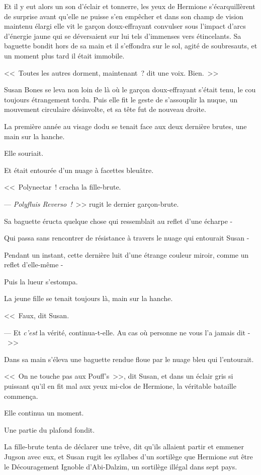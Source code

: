 Et il y eut alors un son d'éclair et tonnerre, les yeux de Hermione s'écarquillèrent de surprise avant qu'elle ne puisse s'en empêcher et dans son champ de vision maintenu élargi elle vit le garçon doux-effrayant convulser sous l'impact d'arcs d'énergie jaune qui se déversaient sur lui tels d'immenses vers étincelants. Sa baguette bondit hors de sa main et il s'effondra sur le sol, agité de soubresauts, et un moment plus tard il était immobile.

<<~Toutes les autres dorment, maintenant~? dit une voix. Bien.~>>

Susan Bones se leva non loin de là où le garçon doux-effrayant s'était tenu, le cou toujours étrangement tordu. Puis elle fit le geste de s'assouplir la nuque, un mouvement circulaire désinvolte, et sa tête fut de nouveau droite.

La première année au visage dodu se tenait face aux deux dernière brutes, une main sur la hanche.

Elle souriait.

Et était entourée d'un nuage à facettes bleuâtre.

<<~Polynectar~! cracha la fille-brute.

--- \emph{Polyfluis Reverso~!}~>> rugit le dernier garçon-brute.

Sa baguette éructa quelque chose qui ressemblait au reflet d'une écharpe -

Qui passa sans rencontrer de résistance à travers le nuage qui entourait Susan -

Pendant un instant, cette dernière luit d'une étrange couleur miroir, comme un reflet d'elle-même -

Puis la lueur s'estompa.

La jeune fille se tenait toujours là, main sur la hanche.

<<~Faux, dit Susan.

--- Et \emph{c'est} la vérité, continua-t-elle. Au cas où personne ne vous l'a jamais dit -~>>

Dans sa main s'éleva une baguette rendue floue par le nuage bleu qui l'entourait.

<<~On ne touche pas aux Pouff's~>>, dit Susan, et dans un éclair gris si puissant qu'il en fit mal aux yeux mi-clos de Hermione, la véritable bataille commença.

Elle continua un moment.

Une partie du plafond fondit.

La fille-brute tenta de déclarer une trêve, dit qu'ils allaient partir et emmener Jugson avec eux, et Susan rugit les syllabes d'un sortilège que Hermione sut être le Découragement Ignoble d'Abi-Dalzim, un sortilège illégal dans sept pays.

